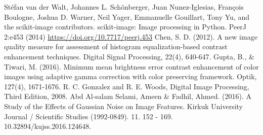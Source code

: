 \documentclass[conference]{IEEEtran}
\begin{document}
\begin{thebibliography}{00}
 Stéfan van der Walt, Johannes L. Schönberger, Juan Nunez-Iglesias, François Boulogne, Joshua D. Warner, Neil Yager, Emmanuelle Gouillart, Tony Yu, and the scikit-image contributors. scikit-image: Image processing in Python. PeerJ 2:e453 (2014) \url{https://doi.org/10.7717/peerj.453}
 Chen, S. D. (2012). A new image quality measure for assessment of histogram equalization-based contrast enhancement techniques. Digital Signal Processing, 22(4), 640-647.
 Gupta, B., \& Tiwari, M. (2016). Minimum mean brightness error contrast enhancement of color images using adaptive gamma correction with color preserving framework. Optik, 127(4), 1671-1676.
 R. C. Gonzalez and R. E. Woods, Digital Image Processing, Third Edition,
2008.
 Abd Al-salam Selami, Ameen & Fadhil, Ahmed. (2016). A Study of the Effects of Gaussian Noise on Image Features. Kirkuk University Journal / Scientific Studies (1992-0849). 11. 152 - 169. 10.32894/kujss.2016.124648.
\end{thebibliography}
\vspace{12pt}
\end{document}
